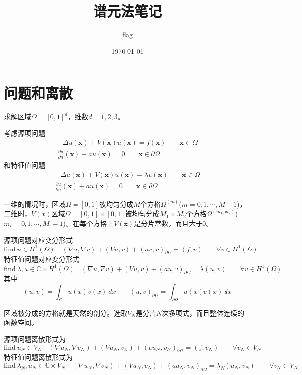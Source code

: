 \documentclass[UTF8,12pt]{article}
\title{谱元法笔记}
\author{flag}
\date{\today}
\begin{document}
\maketitle

\section{问题和离散}

求解区域$\Omega = [0,1]^d$，维数$d = 1, 2, 3$。

考虑源项问题
\begin{eqnarray}
- \Delta u(\mathbf{x}) + V(\mathbf{x}) u(\mathbf{x}) = f(\mathbf{x}) \qquad \mathbf{x} \in \Omega \\
\frac{\partial u}{\partial n}(\mathbf{x}) + a u(\mathbf{x}) = 0 \qquad \mathbf{x} \in \partial \Omega
\end{eqnarray}
和特征值问题
\begin{eqnarray}
- \Delta u(\mathbf{x}) + V(\mathbf{x}) u(\mathbf{x}) = \lambda u(\mathbf{x}) \qquad \mathbf{x} \in \Omega \\
\frac{\partial u}{\partial n}(\mathbf{x}) + a u(\mathbf{x}) = 0 \qquad \mathbf{x} \in \partial \Omega
\end{eqnarray}

一维的情况时，区域$\Omega=[0,1]$被均匀分成$M$个方格$\Omega^{(m)}$($m = 0, 1, \cdots, M-1$)，二维时，$V(x)$区域$\Omega=[0,1] \times [0,1]$被均匀分成$M_1 \times M_2$个方格$\Omega^{(m_1, m_2)}$($m_i = 0, 1, \cdots, M_i-1$)。在每个方格上$V(\mathbf{x})$是分片常数，而且大于0。

源项问题对应变分形式
\begin{equation}
\text{find} \ u \in H^1(\Omega) \quad (\nabla u, \nabla v) + (V u, v) + (a u, v)_{\partial\Omega} = (f, v) \qquad \forall v \in  H^1(\Omega)
\end{equation}
特征值问题对应变分形式
\begin{equation}
\text{find} \ \lambda, u \in \mathbb{C} \times H^1(\Omega) \quad (\nabla u, \nabla v) + (V u, v) + (a u, v)_{\partial\Omega} = \lambda (u, v) \qquad \forall v \in  H^1(\Omega)
\end{equation}
其中
$$ (u, v) = \int_\Omega u(x) v(x) \ dx \qquad (u, v)_{\partial\Omega} = \int_{\partial\Omega} u(x) v(x) \ dx $$

区域被分成的方格就是天然的剖分。选取$V_N$是分片$N$次多项式，而且整体连续的函数空间。

源项问题离散形式为
\begin{equation}
\text{find} \ u_N \in V_N \quad (\nabla u_N, \nabla v_N) + (V u_N, v_N) + (a u_N, v_N)_{\partial\Omega} = (f, v_N) \qquad \forall v_N \in V_N
\end{equation}
特征值问题离散形式为
\begin{equation}
\text{find} \ \lambda_N, u_N \in \mathbb{C} \times V_N \quad (\nabla u_N, \nabla v_N) + (V u_N, v_N) + (a u_N, v_N)_{\partial\Omega} = \lambda_N (u_N, v_N) \qquad \forall v_N \in V_N
\end{equation}
\end{document}
